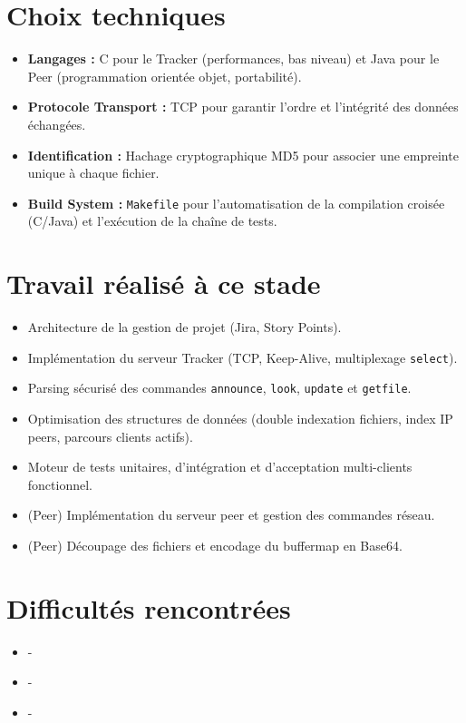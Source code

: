 \documentclass[11pt, a4paper]{article}
\begin{document}
\section{Choix techniques}
\begin{itemize}
    \item \textbf{Langages :} C pour le Tracker (performances, bas niveau) et Java pour le Peer (programmation orientée objet, portabilité).
    \item \textbf{Protocole Transport :} TCP pour garantir l'ordre et l'intégrité des données échangées.
    \item \textbf{Identification :} Hachage cryptographique MD5 pour associer une empreinte unique à chaque fichier.
    \item \textbf{Build System :} \texttt{Makefile} pour l'automatisation de la compilation croisée (C/Java) et l'exécution de la chaîne de tests.
\end{itemize}

\section{Travail réalisé à ce stade}
\begin{itemize}
    \item Architecture de la gestion de projet (Jira, Story Points).
    \item Implémentation du serveur Tracker (TCP, Keep-Alive, multiplexage \texttt{select}).
    \item Parsing sécurisé des commandes \texttt{announce}, \texttt{look}, \texttt{update} et \texttt{getfile}.
    \item Optimisation des structures de données (double indexation fichiers, index IP peers, parcours clients actifs).
    \item Moteur de tests unitaires, d'intégration et d'acceptation multi-clients fonctionnel.
    \item (Peer) Implémentation du serveur peer et gestion des commandes réseau.
    \item (Peer) Découpage des fichiers et encodage du buffermap en Base64.
\end{itemize}

\section{Difficultés rencontrées}
\begin{itemize}
    \item -
    \item -
    \item -
\end{itemize}
\end{document}
